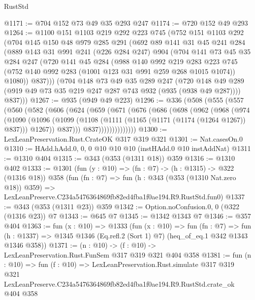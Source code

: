 \begin{lexlean}{RustStd}
\begin{coremodule}
@1171 := @704 @152 @73 @49 @35 @293 @247
@1174 := @720 @152 @49 @293
@1264 := @1100
    @151
    @1103
    @219
    @292
    @223
    @745
    (@752
      @151
      @1103
      @292
      (@704
        @145
        @150
        @48
        @979
        @285
        @291
        (@692
          @89
          @141
          @31
          @45
          @241
          @284
          (@889
            @143
            @31
            @991
            @241
            (@226 @284 @247)
            @904
            (@704
              @141
              @73
              @45
              @35
              @284
              @247
              (@720
                @141
                @45
                @284
                (@988
                  @140
                  @992
                  @219
                  @283
                  @223
                  @745
                  (@752 @140 @992 @283 (@1001 @123 @31 @991 @259 @268 @1015 @1074))
                  @1080))
              @837)))
        (@704
          @148
          @73
          @49
          @35
          @289
          @247
          (@720 @148 @49 @289 (@919 @49 @73 @35 @219 @247 @287 @743 @932 (@935 (@938 @49 @287))))
          @837)))
@1267 := @935 (@949 @49 @223)
@1296 := @336
    (@508
      (@555
        (@557
          (@560
            (@582
              (@606
                (@624
                  (@659
                    (@671
                      (@676
                        (@686
                          (@698
                            (@962
                              (@968
                                (@974
                                  (@1090
                                    (@1096
                                      (@1099
                                        (@1108
                                          (@1111 (@1165 (@1171 (@1174 (@1264 @1267)) @837)))
                                          @1267))
                                      @837)))
                                @837))))))))))))))
@1300 := LexLeanPreservation.Rust.CrateOK @317 @319 @321
@1301 := Nat.casesOn.{0}
@1310 := HAdd.hAdd.{0, 0, 0} @10 @10 @10 (instHAdd.{0} @10 instAddNat)
@1311 := @1310 @404
@1315 := @343 (@353 (@1311 @18)) @359
@1316 := @1310 @402
@1333 := @1301
    (fun (y : @10) => (fn : @7) -> (h : @1315) -> @322 (@1316 @18))
    @358
    (fun (fn : @7) =>
    fun (h : @343 (@353 (@1310 Nat.zero @18)) @359) =>
    LexLeanPreserve.C234a5476364869fb82ed4fba1f0ae194.R9.RustStd.fun0)
@1337 := @343 (@353 (@1311 @23)) @359
@1342 := Option.noConfusion.{0, 0} (@322 (@1316 @23)) @7
@1343 := @645 @7
@1345 := @1342 @1343 @7
@1346 := @357 @404
@1363 := fun (x : @10) =>
  @1333
    (fun (x : @10) =>
    fun (fn : @7) =>
    fun (h : @1337) => @1345 @1346 (Eq.refl.{2} (Sort 1) @7) (heq_of_eq.{1} @342 @1343 @1346 @358))
@1371 := (n : @10) -> (f : @10) -> LexLeanPreservation.Rust.FunSem @317 @319 @321 @404 @358
@1381 := fun (n : @10) =>
  fun (f : @10) =>
  LexLeanPreservation.Rust.simulate
    @317
    @319
    @321
    LexLeanPreserve.C234a5476364869fb82ed4fba1f0ae194.R9.RustStd.crate_ok
    @404
    @358
\end{coremodule}
\end{lexlean}
